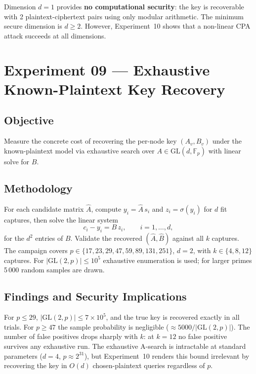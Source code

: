 \documentclass[12pt,a4paper]{article}
\theoremstyle{definition}
\newcommand{\Fp}{\mathbb{F}_p}
\newcommand{\GL}{\mathrm{GL}}
\begin{document}
Dimension $d = 1$ provides \textbf{no computational security}: the
key is recoverable with 2 plaintext-ciphertext pairs using only
modular arithmetic. The minimum secure dimension is $d \geq 2$.
However, Experiment~10 shows that a non-linear CPA attack succeeds
at all dimensions.

\section{Experiment 09 --- Exhaustive Known-Plaintext Key Recovery}

\subsection{Objective}

Measure the concrete cost of recovering the per-node key $(A_v, B_v)$
under the known-plaintext model via exhaustive search over
$A \in \GL(d, \Fp)$ with linear solve for $B$.

\subsection{Methodology}

For each candidate matrix $\hat{A}$, compute
$y_i = \hat{A}\, s_i$ and $z_i = \sigma(y_i)$ for $d$ fit captures,
then solve the linear system
\begin{equation}
  c_i - y_i = B\, z_i, \qquad i = 1, \ldots, d,
\end{equation}
for the $d^2$ entries of $B$. Validate the recovered $(\hat{A}, \hat{B})$
against all $k$ captures. The campaign covers
$p \in \{17, 23, 29, 47, 59, 89, 131, 251\}$, $d = 2$,
with $k \in \{4, 8, 12\}$ captures. For
$|\GL(2, p)| \leq 10^5$ exhaustive enumeration is used;
for larger primes 5\,000 random samples are drawn.

\subsection{Findings and Security Implications}

For $p \leq 29$, $|\GL(2, p)| \leq 7\times 10^5$, and the true key
is recovered exactly in all trials. For $p \geq 47$ the sample
probability is negligible (${\approx}5000/|\GL(2,p)|$). The number
of false positives drops sharply with $k$: at $k = 12$ no false
positive survives any exhaustive run. The exhaustive A-search is
intractable at standard parameters ($d = 4$, $p \approx 2^{31}$),
but Experiment~10 renders this bound irrelevant by recovering the
key in $O(d)$ chosen-plaintext queries regardless of $p$.
\end{document}
